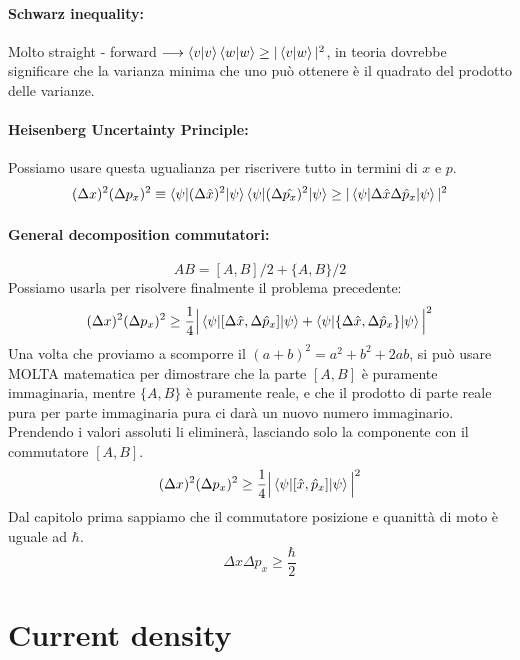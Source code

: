 \paragraph{Schwarz inequality:}
Molto straight - forward $\longrightarrow \braket{v|v}\braket{w|w}\geq|\braket{v|w}|^2$, in teoria dovrebbe significare che la varianza minima che uno può ottenere è il quadrato del prodotto delle varianze.

\paragraph{Heisenberg Uncertainty Principle:}
Possiamo usare questa ugualianza per riscrivere tutto in termini di $x$ e $p$.
$$(\Delta x)^2(\Delta p_x)^2 \equiv \braket{\psi|(\Delta \hat{x})^2|\psi}\braket{\psi|(\Delta \hat{p_x})^2|\psi} \geq |\braket{\psi|\Delta\hat{x}\Delta\hat{p}_x|\psi}|^2$$

\paragraph{General decomposition commutatori:}
$$AB = [A, B] / 2 + \{A, B\} / 2$$
Possiamo usarla per risolvere finalmente il problema precedente:
$$(\Delta x)^2(\Delta p_x)^2 \geq \frac{1}{4}\Big|\braket{\psi|[\Delta\hat{x}, \Delta\hat{p}_x]|\psi} + \braket{\psi|\{\Delta\hat{x}, \Delta\hat{p}_x\}|\psi}\Big|^2$$
Una volta che proviamo a scomporre il $(a + b)^2 = a^2 + b^2 + 2ab$, si può usare MOLTA matematica per dimostrare che la parte $[A,B]$ è puramente immaginaria, mentre $\{A, B\}$ è puramente reale, e che il prodotto di parte reale pura per parte immaginaria pura ci darà un nuovo numero immaginario. Prendendo i valori assoluti li eliminerà, lasciando solo la componente con il commutatore $[A,B]$.
$$(\Delta x)^2(\Delta p_x)^2 \geq \frac{1}{4}\Big|\braket{\psi|[\hat{x}, \hat{p}_x]|\psi}\Big|^2$$
Dal capitolo prima sappiamo che il commutatore posizione e quanittà di moto è uguale ad $\hbar$.
$$\Delta x\Delta p_x \geq \frac{\hbar}{2}$$


\section{Current density}


